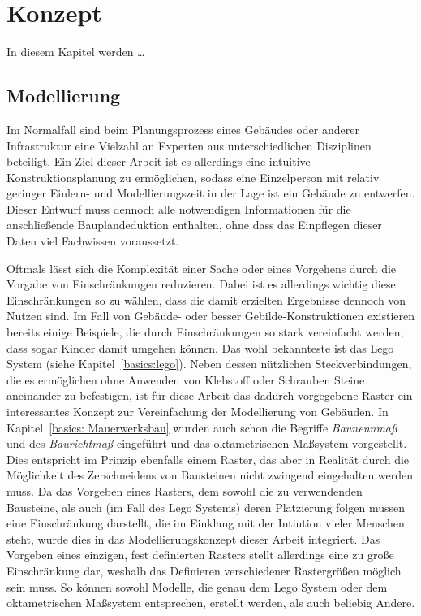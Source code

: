 \chapter{Konzept}
In diesem Kapitel werden \dots

\section{Modellierung}
Im Normalfall sind beim Planungsprozess eines Gebäudes oder anderer Infrastruktur eine Vielzahl an Experten aus unterschiedlichen Disziplinen beteiligt.
Ein Ziel dieser Arbeit ist es allerdings eine intuitive Konstruktionsplanung zu ermöglichen, sodass eine Einzelperson mit relativ geringer Einlern- und Modellierungszeit in der Lage ist ein Gebäude zu entwerfen.
Dieser Entwurf muss dennoch alle notwendigen Informationen für die anschließende Bauplandeduktion enthalten, ohne dass das Einpflegen dieser Daten viel Fachwissen voraussetzt.

Oftmals lässt sich die Komplexität einer Sache oder eines Vorgehens durch die Vorgabe von Einschränkungen reduzieren.
Dabei ist es allerdings wichtig diese Einschränkungen so zu wählen, dass die damit erzielten Ergebnisse dennoch von Nutzen sind.
Im Fall von Gebäude- oder besser Gebilde-Konstruktionen existieren bereits einige Beispiele, die durch Einschränkungen so stark vereinfacht werden, dass sogar Kinder damit umgehen können.
Das wohl bekannteste ist das Lego System (siehe Kapitel~\ref{basics:lego}).
Neben dessen nützlichen Steckverbindungen, die es ermöglichen ohne Anwenden von Klebstoff oder Schrauben Steine aneinander zu befestigen, ist für diese Arbeit das dadurch vorgegebene Raster ein interessantes Konzept zur Vereinfachung der Modellierung von Gebäuden.
In Kapitel~\ref{basics: Mauerwerksbau} wurden auch schon die Begriffe \textit{Baunennmaß} und des \textit{Baurichtmaß} eingeführt und das oktametrischen Maßsystem vorgestellt.
Dies entspricht im Prinzip ebenfalls einem Raster, das aber in Realität durch die Möglichkeit des Zerschneidens von Bausteinen nicht zwingend eingehalten werden muss.
Da das Vorgeben eines Rasters, dem sowohl die zu verwendenden Bausteine, als auch (im Fall des Lego Systems) deren Platzierung folgen müssen eine Einschränkung darstellt, die im Einklang mit der Intiution vieler Menschen steht, wurde dies in das Modellierungskonzept dieser Arbeit integriert.
Das Vorgeben eines einzigen, fest definierten Rasters stellt allerdings eine zu große Einschränkung dar, weshalb das Definieren verschiedener Rastergrößen möglich sein muss.
So können sowohl Modelle, die genau dem Lego System oder dem oktametrischen Maßsystem entsprechen, erstellt werden, als auch beliebig Andere.

